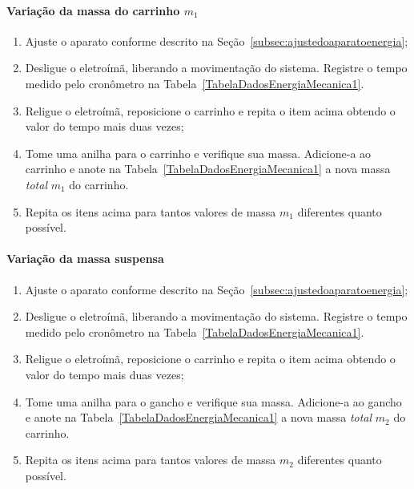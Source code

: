 \paragraph{Variação da massa do carrinho $m_1$}
\begin{enumerate}
    \item Ajuste o aparato conforme descrito na Seção~\ref{subsec:ajustedoaparatoenergia};
	\item Desligue o eletroímã, liberando a movimentação do sistema. Registre o tempo medido pelo cronômetro na Tabela~\ref{TabelaDadosEnergiaMecanica1}.
	\item Religue o eletroímã, reposicione o carrinho e repita o item acima obtendo o valor do tempo mais duas vezes;
	\item Tome uma anilha para o carrinho e verifique sua massa. Adicione-a ao carrinho e anote na Tabela~\ref{TabelaDadosEnergiaMecanica1} a nova massa \emph{total} $m_1$ do carrinho.
	\item Repita os itens acima para tantos valores de massa $m_1$ diferentes quanto possível.
\end{enumerate}

\paragraph{Variação da massa suspensa}
\begin{enumerate}
    \item Ajuste o aparato conforme descrito na Seção~\ref{subsec:ajustedoaparatoenergia};
	\item Desligue o eletroímã, liberando a movimentação do sistema. Registre o tempo medido pelo cronômetro na Tabela~\ref{TabelaDadosEnergiaMecanica1}.
	\item Religue o eletroímã, reposicione o carrinho e repita o item acima obtendo o valor do tempo mais duas vezes;
    \item Tome uma anilha para o gancho e verifique sua massa. Adicione-a ao gancho e anote na Tabela~\ref{TabelaDadosEnergiaMecanica1} a nova massa \emph{total} $m_2$ do carrinho.
	\item Repita os itens acima para tantos valores de massa $m_2$ diferentes quanto possível.
\end{enumerate}

